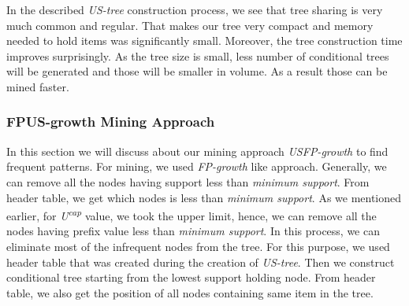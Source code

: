 \documentclass[conference]{IEEEtran}
\begin{document}
In the described \emph{US-tree} construction process, we see that tree sharing is very much common and regular. That makes our tree very compact and memory needed to hold items was significantly small. Moreover, the tree construction time improves surprisingly. As the tree size is small, less number of conditional trees will be generated and those will be smaller in volume. As a result those can be mined faster.

\subsubsection{FPUS-growth Mining Approach}
In this section we will discuss about our mining approach \emph{USFP-growth} to find frequent patterns. For mining, we used \emph{FP-growth} like approach. Generally, we can remove all the nodes having support less than \emph{minimum support}. From header table, we get which nodes is less than \emph{minimum support}. As we mentioned earlier, for \emph{U\textsuperscript{cap}} value, we took the upper limit, hence, we can remove all the nodes having prefix value less than \emph{minimum support}. In this process, we can eliminate most of the infrequent nodes from the tree. For this purpose, we used header table that was created during the creation of \emph{US-tree}. Then we construct conditional tree starting from the lowest support holding node. From header table, we also get the position of all nodes containing same item in the tree.
\end{document}
